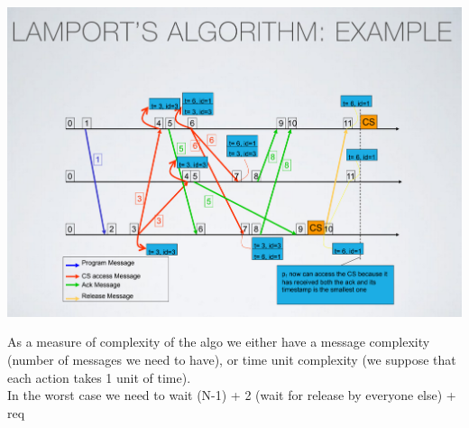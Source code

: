 \documentclass[11pt, a4paper]{article}
\begin{document}
\begin{center}
    \includegraphics[scale=0.5]{img/mutex/example.png}
\end{center}
As a measure of complexity of the algo we either have a message complexity (number of messages we need to have), or time unit complexity (we suppose that each action takes 1 unit of time).\\
In the worst case we need to wait (N-1) + 2 (wait for release by everyone else) + req
\end{document}
